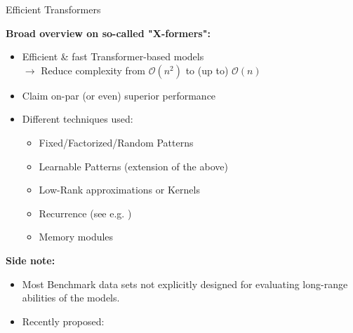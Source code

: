 \documentclass[]{beamer}
\begin{document}
\begin{frame}{Efficient Transformers \href{https://arxiv.org/pdf/2009.06732.pdf}{}}

\textbf{Broad overview on so-called "X-formers":}

\begin{itemize}
	\item Efficient \& fast Transformer-based models\\
				$\rightarrow$ Reduce complexity from $\mathcal{O}(n^2)$ to (up to) $\mathcal{O}(n)$
	\item Claim on-par (or even) superior performance
	\item Different techniques used:
				\begin{itemize}
					\item Fixed/Factorized/Random Patterns
					\item Learnable Patterns (extension of the above)
					\item Low-Rank approximations or Kernels
					\item Recurrence (see e.g. \href{https://arxiv.org/pdf/1901.02860.pdf}{})
					\item Memory modules
				\end{itemize}
\end{itemize}
	
	\vspace{.3cm}
	
\textbf{Side note:}

\begin{itemize}
	\item Most Benchmark data sets not explicitly designed for evaluating long-range abilities of the models.
	\item Recently proposed: \href{https://arxiv.org/pdf/2011.04006.pdf}{}
\end{itemize}
	
\end{frame}
\end{document}
